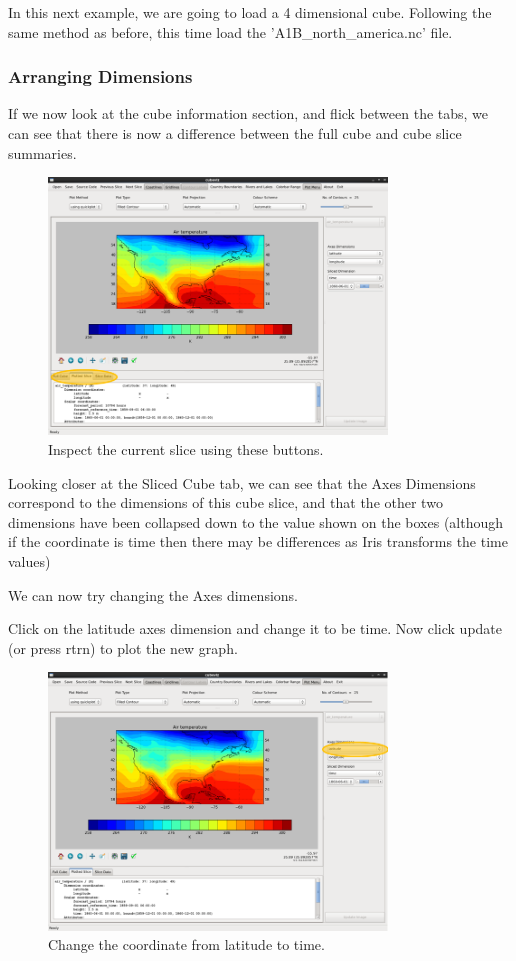 \documentclass[a4paper,12pt]{article}
\begin{document}
In this next example, we are going to load a 4 dimensional cube. Following the
same method as before, this time load the 'A1B\_north\_america.nc' file.

\subsubsection{Arranging Dimensions}

If we now look at the cube information section, and flick between the tabs, we
can see that there is now a difference between the full cube and cube slice
summaries.

\begin{figure}[H]
\centering
\includegraphics[width=90mm]{resources/tute11.PNG}
\caption{Inspect the current slice using these buttons.}
\label{overflow}
\end{figure}


Looking closer at the Sliced Cube tab, we can see that the Axes Dimensions
correspond to the dimensions of this cube slice, and that the other two
dimensions have been collapsed down to the value shown on the boxes (although
if the coordinate is time then there may be differences as Iris transforms
the time values)

We can now try changing the Axes dimensions.

Click on the latitude axes dimension and change it to be time.
Now click update (or press rtrn) to plot the new graph.

\begin{figure}[H]
\centering
\includegraphics[width=90mm]{resources/tute12.PNG}
\caption{Change the coordinate from latitude to time.}
\label{overflow}
\end{figure}
\end{document}
